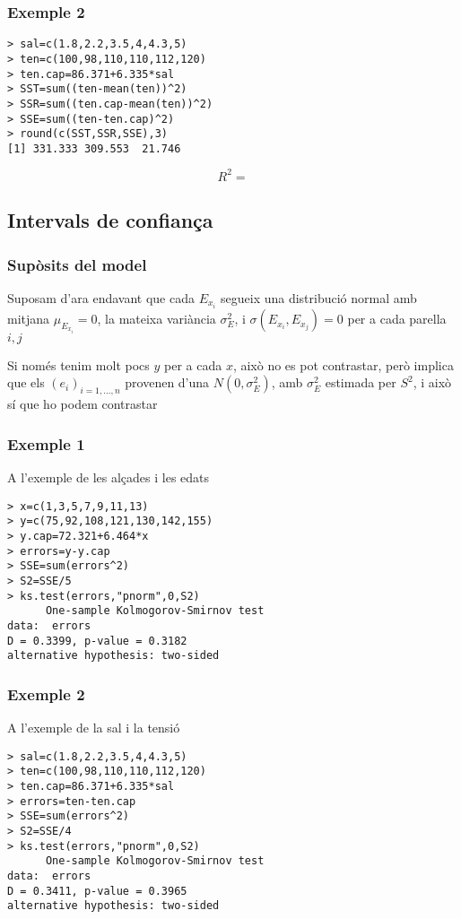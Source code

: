 \documentclass[12pt,t]{beamer}
\renewcommand{\emph}[1]{{\color{red}#1}}
\theoremstyle{plain}
\theoremstyle{definition}
\begin{document}
\begin{frame}[fragile]
\frametitle{Exemple 2}
\vspace*{-3ex}

\small \begin{verbatim}
> sal=c(1.8,2.2,3.5,4,4.3,5)
> ten=c(100,98,110,110,112,120)
> ten.cap=86.371+6.335*sal
> SST=sum((ten-mean(ten))^2)
> SSR=sum((ten.cap-mean(ten))^2)
> SSE=sum((ten-ten.cap)^2)
> round(c(SST,SSR,SSE),3)
[1] 331.333 309.553  21.746
\end{verbatim}
$$
R^2=
$$
\end{frame}


\subsection{Intervals de confiança}

\begin{frame}
\frametitle{Supòsits del model}

Suposam d'ara endavant que \emph{cada $E_{x_i}$ segueix una distribució normal amb mitjana $\mu_{E_{x_i}}=0$, la mateixa variància $\sigma_E^2$, i $\sigma(E_{x_i},E_{x_j})=0$ per a cada parella $i,j$}
\bigskip

Si només tenim molt pocs $y$ per a cada $x$, això no es pot contrastar, però implica que els $(e_i)_{i=1,\ldots,n}$ provenen d'una $N(0,\sigma_E^2)$, amb $\sigma_E^2$ estimada per $S^2$, i això sí que ho podem contrastar
\end{frame}

\begin{frame}[fragile]
\frametitle{Exemple 1}
A l'exemple de les alçades i les edats
\begin{verbatim}
> x=c(1,3,5,7,9,11,13)
> y=c(75,92,108,121,130,142,155)
> y.cap=72.321+6.464*x
> errors=y-y.cap
> SSE=sum(errors^2)
> S2=SSE/5
> ks.test(errors,"pnorm",0,S2)
      One-sample Kolmogorov-Smirnov test
data:  errors 
D = 0.3399, p-value = 0.3182
alternative hypothesis: two-sided 
\end{verbatim}
\end{frame}

\begin{frame}[fragile]
\frametitle{Exemple 2}
A l'exemple de la sal i la tensió
\begin{verbatim}
> sal=c(1.8,2.2,3.5,4,4.3,5)
> ten=c(100,98,110,110,112,120)
> ten.cap=86.371+6.335*sal
> errors=ten-ten.cap
> SSE=sum(errors^2)
> S2=SSE/4
> ks.test(errors,"pnorm",0,S2)
      One-sample Kolmogorov-Smirnov test
data:  errors 
D = 0.3411, p-value = 0.3965
alternative hypothesis: two-sided 
\end{verbatim}
\end{frame}
\end{document}
